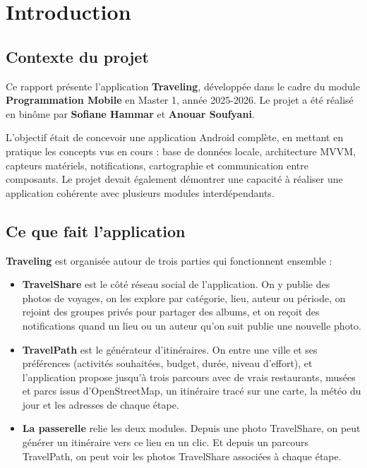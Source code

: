 \documentclass[a4paper,12pt,openany]{report}
\begin{document}
\chapter{Introduction}

\section{Contexte du projet}

Ce rapport présente l'application \textbf{Traveling}, développée dans le cadre du module
\textbf{Programmation Mobile} en Master 1, année 2025-2026. Le projet a été réalisé en
binôme par \textbf{Sofiane Hammar} et \textbf{Anouar Soufyani}.

L'objectif était de concevoir une application Android complète, en mettant en pratique
les concepts vus en cours : base de données locale, architecture MVVM, capteurs matériels,
notifications, cartographie et communication entre composants. Le projet devait également
démontrer une capacité à réaliser une application cohérente avec plusieurs modules
interdépendants.

\section{Ce que fait l'application}

\textbf{Traveling} est organisée autour de trois parties qui fonctionnent ensemble :

\begin{itemize}
  \item \textbf{TravelShare} est le côté réseau social de l'application. On y publie des
    photos de voyages, on les explore par catégorie, lieu, auteur ou période, on rejoint
    des groupes privés pour partager des albums, et on reçoit des notifications quand
    un lieu ou un auteur qu'on suit publie une nouvelle photo.

  \item \textbf{TravelPath} est le générateur d'itinéraires. On entre une ville et ses
    préférences (activités souhaitées, budget, durée, niveau d'effort), et l'application
    propose jusqu'à trois parcours avec de vrais restaurants, musées et parcs issus
    d'OpenStreetMap, un itinéraire tracé sur une carte, la météo du jour et les adresses
    de chaque étape.

  \item \textbf{La passerelle} relie les deux modules. Depuis une photo TravelShare, on
    peut générer un itinéraire vers ce lieu en un clic. Et depuis un parcours TravelPath,
    on peut voir les photos TravelShare associées à chaque étape.
\end{itemize}
\end{document}
